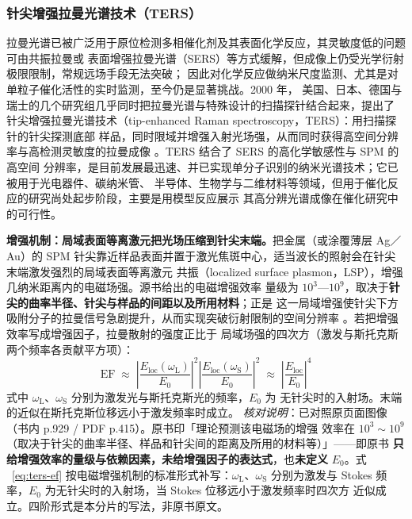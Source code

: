 \subsubsection{针尖增强拉曼光谱技术（TERS）}
\label{ssec:ters}

拉曼光谱已被广泛用于原位检测多相催化剂及其表面化学反应，其灵敏度低的问题可由共振拉曼或
表面增强拉曼光谱（SERS）等方式缓解，但成像上仍受光学衍射极限限制，常规远场手段无法突破；
因此对化学反应做纳米尺度监测、尤其是对单粒子催化活性的实时监测，至今仍是显著挑战。2000 年，
美国、日本、德国与瑞士的几个研究组几乎同时把拉曼光谱与特殊设计的扫描探针结合起来，提出了
针尖增强拉曼光谱技术（tip-enhanced Raman spectroscopy，TERS）：用扫描探针的针尖探测底部
样品，同时限域并增强入射光场强，从而同时获得高空间分辨率与高检测灵敏度的拉曼成像
。TERS 结合了 SERS 的高化学敏感性与 SPM 的高空间
分辨率，是目前发展最迅速、并已实现单分子识别的纳米光谱技术；它已被用于光电器件、碳纳米管、
半导体、生物学与二维材料等领域，但用于催化反应的研究尚处起步阶段，主要是用模型反应展示
其高分辨光谱成像在催化研究中的可行性。

\begin{principle}
\textbf{增强机制：局域表面等离激元把光场压缩到针尖末端。}把金属（或涂覆薄层 Ag／Au）的 SPM
针尖靠近样品表面并置于激光焦斑中心，适当波长的照射会在针尖末端激发强烈的局域表面等离激元
共振（localized surface plasmon，LSP），增强几纳米距离内的电磁场强。源书给出的电磁增强效率
量级为 $10^{3}$—$10^{9}$，取决于\textbf{针尖的曲率半径、针尖与样品的间距以及所用材料}；正是
这一局域增强使针尖下方吸附分子的拉曼信号急剧提升，从而实现突破衍射限制的空间分辨率
。若把增强效率写成增强因子，拉曼散射的强度正比于
局域场强的四次方（激发与斯托克斯两个频率各贡献平方项）：
\begin{equation}\label{eq:ters-ef}
\mathrm{EF}\;\approx\;
\left|\frac{E_{\mathrm{loc}}(\omega_{\mathrm{L}})}{E_{0}}\right|^{2}
\left|\frac{E_{\mathrm{loc}}(\omega_{\mathrm{S}})}{E_{0}}\right|^{2}
\;\approx\;\left|\frac{E_{\mathrm{loc}}}{E_{0}}\right|^{4}
\end{equation}
式中 $\omega_{\mathrm{L}}$、$\omega_{\mathrm{S}}$ 分别为激发光与斯托克斯光的频率，$E_0$ 为
无针尖时的入射场。末端的近似在斯托克斯位移远小于激发频率时成立。
\emph{核对说明}：已对照原页面图像（书内 p.929 / PDF p.415）。原书印「理论预测该电磁场的增强
效率在 $10^{3}\sim10^{9}$（取决于针尖的曲率半径、样品和针尖间的距离及所用的材料等）」——即原书
\textbf{只给增强效率的量级与依赖因素，未给增强因子的表达式}，也\textbf{未定义} $E_0$。式
~\eqref{eq:ters-ef} 按电磁增强机制的标准形式补写：$\omega_{\mathrm{L}}$、$\omega_{\mathrm{S}}$
分别为激发与 Stokes 频率，$E_{0}$ 为无针尖时的入射场，当 Stokes 位移远小于激发频率时四次方
近似成立。四阶形式是本分片的写法，非原书原文。
\end{principle}

